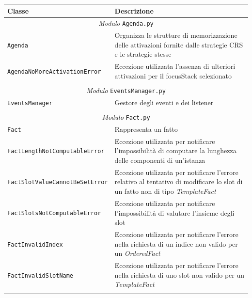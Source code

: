 \begin{longtable}{p{5.5cm}p{6.5cm}}
\hline 
\textbf{Classe} & \textbf{Descrizione} \\ 
\hline\hline 
\endhead

\multicolumn{2}{c}{\emph{Modulo} \texttt{Agenda.py}}\\
	\hdashline[5pt/5pt]
		\texttt{Agenda} & Organizza le strutture di memorizzazione delle attivazioni fornite dalle strategie CRS e le strategie stesse\\ 
	\hdashline[1pt/5pt]
		\texttt{AgendaNoMoreActi\-vationError} & Eccezione utilizzata l'assenza di ulteriori attivazioni per il focusStack selezionato\\ 
	\hline\\

\multicolumn{2}{c}{\emph{Modulo} \texttt{EventsManager.py}}\\
	\hdashline[5pt/5pt]
		\texttt{EventsManager} & Gestore degli eventi e dei listener\\ 
	\hline\\

\multicolumn{2}{c}{\emph{Modulo} \texttt{Fact.py}}\\
	\hdashline[5pt/5pt]
		\texttt{Fact} & Rappresenta un fatto\\ 
	\hdashline[1pt/5pt]
		\texttt{Fact\-Length\-Not\-Computable\-Error} & Eccezione utilizzata per notificare l'impossibilità di computare la lunghezza delle componenti di un'istanza \\ 
	\hdashline[1pt/5pt]
		\texttt{Fact\-Slot\-Value\-Can\-not\-Be\-Set\-Er\-ror} & Eccezione utilizzata per notificare l'errore relativo al tentativo di modificare lo slot di un fatto non di tipo \emph{TemplateFact}\\ 
	\hdashline[1pt/5pt]
		\texttt{Fact\-Slots\-Not\-Com\-pu\-ta\-ble\-Error} & Eccezione utilizzata per notificare l'impossibilità di valutare l'insieme degli slot\\
	\hdashline[1pt/5pt]
		\texttt{Fact\-InvalidIndex} & Eccezione utilizzata per notificare l'errore nella richiesta di un indice non valido per un \emph{OrderedFact}\\ 
	\hdashline[1pt/5pt]
		\texttt{Fact\-InvalidSlotName} & Eccezione utilizzata per notificare l'errore nella richiesta di uno slot non valido per un \emph{TemplateFact}\\ 
	\hline\\


\end{longtable}
